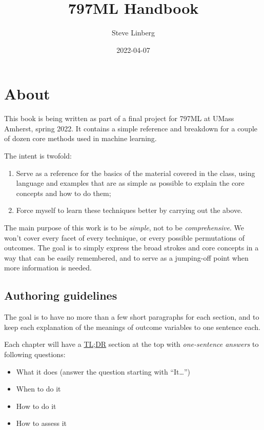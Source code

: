 \documentclass[
]{book}
\title{797ML Handbook}
\author{Steve Linberg}
\date{2022-04-07}
\providecommand{\tightlist}{%
  \setlength{\itemsep}{0pt}\setlength{\parskip}{0pt}}
\begin{document}
\maketitle

{
\setcounter{tocdepth}{1}
\tableofcontents
}
\hypertarget{about}{%
\chapter{About}\label{about}}

This book is being written as part of a final project for 797ML at UMass
Amherst, spring 2022. It contains a simple reference and breakdown for a
couple of dozen core methods used in machine learning.

The intent is twofold:

\begin{enumerate}
\def\labelenumi{\arabic{enumi}.}
\tightlist
\item
  Serve as a reference for the basics of the material covered in the class, using language and examples that are as simple as possible to explain the core concepts and how to do them;
\item
  Force myself to learn these techniques better by carrying out the above.
\end{enumerate}

The main purpose of this work is to be \emph{simple}, not to be \emph{comprehensive}. We won't cover every facet of every technique, or every possible permutations of outcomes. The goal is to simply express the broad strokes and core concepts in a way that can be easily remembered, and to serve as a jumping-off point when more information is needed.

\hypertarget{authoring-guidelines}{%
\section{Authoring guidelines}\label{authoring-guidelines}}

The goal is to have no more than a few short paragraphs for each section, and to keep each explanation of the meanings of outcome variables to one sentence each.

Each chapter will have a \href{https://en.wikipedia.org/wiki/Wikipedia:Too_long;_didn\%27t_read}{TL;DR} section at the top with \emph{one-sentence answers} to following questions:

\begin{itemize}
\tightlist
\item
  What it does (answer the question starting with ``It\ldots{}'')
\item
  When to do it
\item
  How to do it
\item
  How to assess it
\end{itemize}
\end{document}

